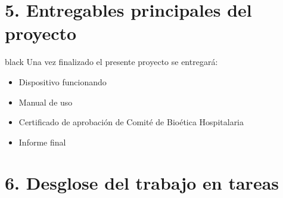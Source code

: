 \documentclass[11pt]{charter}
\begin{document}
\pagebreak

\section{5. Entregables principales del proyecto}
\label{sec:entregables}
\begin{consigna}{black}
Una vez finalizado el presente proyecto se entregará:
\begin{itemize}
\item Dispositivo funcionando
\item Manual de uso
\item Certificado de aprobación de Comité de Bioética Hospitalaria
\item Informe final

\end{itemize}

\end{consigna}

\pagebreak

\section{6. Desglose del trabajo en tareas}
\label{sec:wbs}
\end{document}
